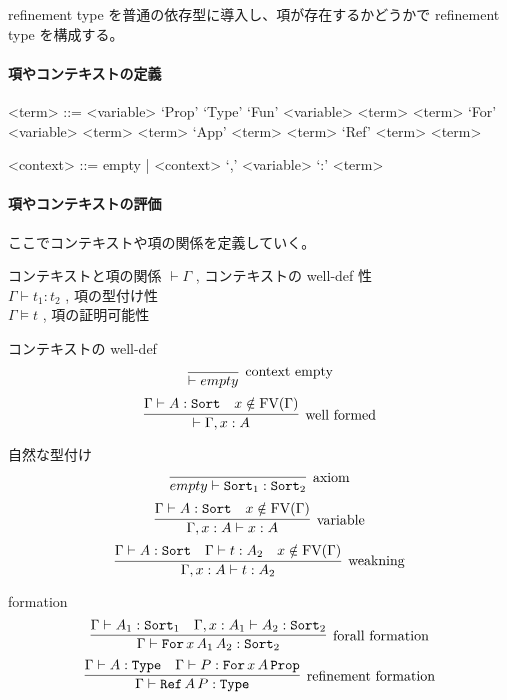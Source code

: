 refinement type を普通の依存型に導入し、項が存在するかどうかで refinement type を構成する。 

\paragraph*{項やコンテキストの定義}
\begin{grammar}
<term> ::= <variable> 
\alt `Prop'
\alt `Type'
\alt `Fun' <variable> <term> <term>
\alt `For' <variable> <term> <term>
\alt `App' <term> <term>
\alt `Ref' <term> <term>

<context> ::= empty | <context> `,' <variable> `:' <term>
\end{grammar}

\paragraph*{項やコンテキストの評価}
ここでコンテキストや項の関係を定義していく。

\begin{itembox}[l]{コンテキストと項の関係}
  \(\vdash \Gamma\) , コンテキストの well-def 性 \\
  \(\Gamma \vdash t_1 : t_2\) , 項の型付け性 \\
  \(\Gamma \vDash t\) , 項の証明可能性
\end{itembox}

\begin{itembox}[l]{コンテキストの well-def}
  \[\infer[\text{context empty}]{\vdash empty}{}\]
  \[\infer[\text{well formed}]{\vdash \Gamma , x : A}{\Gamma \vdash A : \texttt{Sort} & x \notin \text{FV}(\Gamma)}\]
\end{itembox}

\begin{itembox}[l]{自然な型付け}
  \[\infer[\text{axiom}]{empty \vdash \texttt{Sort}_1 : \texttt{Sort}_2}{}\]
  \[\infer[\text{variable}]{\Gamma , x : A \vdash x : A}{\Gamma \vdash A : \texttt{Sort} & x \notin \text{FV}(\Gamma)}\]
  \[\infer[\text{weakning}]{\Gamma , x : A \vdash t : A_2}{\Gamma \vdash A : \texttt{Sort} & \Gamma \vdash t : A_2 & x \notin \text{FV}(\Gamma)} \]
\end{itembox}

\begin{itembox}[l]{formation}
  \[\infer[\text{forall formation}]{\Gamma \vdash \texttt{For} \, x \, A_1 \, A_2 : \texttt{Sort}_2}{\Gamma \vdash A_1 : \texttt{Sort}_1 & \Gamma , x : A_1 \vdash A_2 : \texttt{Sort}_2 }\]
  \[\infer[\text{refinement formation}]{\Gamma \vdash \texttt{Ref} \, A \, P : \texttt{Type}}{\Gamma \vdash A : \texttt{Type} & \Gamma \vdash P : \texttt{For} \, x \, A \, \texttt{Prop}}\]
\end{itembox}

